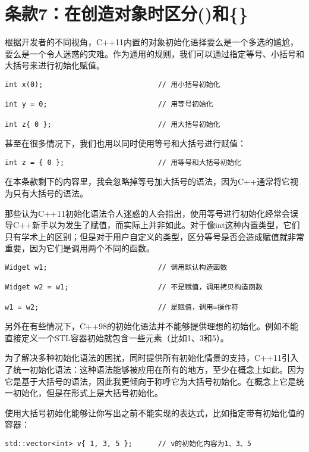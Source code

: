 \section{条款7：在创造对象时区分()和\{\}}

根据开发者的不同视角，C++11内置的对象初始化语择要么是一个多选的尴尬，要么是一个令人迷惑的灾难。作为通用的规则，我们可以通过指定等号、小括号和大括号来进行初始化赋值。

\begin{lstlisting}
int x(0);							// 用小括号初始化

int y = 0;							// 用等号初始化

int z{ 0 };							// 用大括号初始化
\end{lstlisting}

甚至在很多情况下，我们也用以同时使用等号和大括号进行赋值：

\begin{lstlisting}
int z = { 0 };						// 用等号和大括号初始化
\end{lstlisting}

在本条款剩下的内容里，我会忽略掉等号加大括号的语法，因为C++通常将它视为只有大括号的语法。

那些认为C++11初始化语法令人迷惑的人会指出，使用等号进行初始化经常会误导C++新手以为发生了赋值，而实际上并非如此。对于像int这种内置类型，它们只有学术上的区别；但是对于用户自定义的类型，区分等号是否会造成赋值就非常重要，因为它们是调用两个不同的函数。

\begin{lstlisting}
Widget w1; 							// 调用默认构造函数

Widget w2 = w1; 					// 不是赋值，调用拷贝构造函数

w1 = w2; 							// 是赋值，调用=操作符
\end{lstlisting}

另外在有些情况下，C++98的初始化语法并不能够提供理想的初始化。例如不能直接定义一个STL容器初始就包含一些元素（比如1、3和5）。

为了解决多种初始化语法的困扰，同时提供所有初始化情景的支持，C++11引入了统一初始化语法：这种语法能够被应用在所有的地方，至少在概念上如此。因为它是基于大括号的语法，因此我更倾向于称呼它为大括号初始化。在概念上它是统一初始化，但是在形式上是大括号初始化。

使用大括号初始化能够让你写出之前不能实现的表达式，比如指定带有初始化值的容器：

\begin{lstlisting}
std::vector<int> v{ 1, 3, 5 }; 		// v的初始化内容为1、3、5
\end{lstlisting}

